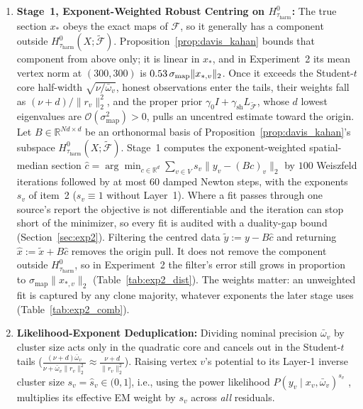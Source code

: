 \documentclass[11pt,a4paper]{article}
\theoremstyle{definition}
\theoremstyle{remark}
\newcommand{\R}{\mathbb{R}}
\begin{document}
\begin{enumerate}[nosep,leftmargin=1.8em]
  \item \textbf{Stage~1, Exponent-Weighted Robust Centring on $H^0_{\tau_{\mathrm{harm}}}$:} The true section $x_*$ obeys the exact maps of $\mathcal{F}$, so it generally has a component outside $H^0_{\tau_{\mathrm{harm}}}(X;\widetilde{\mathcal{F}})$. Proposition~\ref{prop:davis_kahan} bounds that component from above only; it is linear in $x_*$, and in Experiment~2 its mean vertex norm at $(300,300)$ is $0.53\,\sigma_{\mathrm{map}}\|x_{*,v}\|_2$. Once it exceeds the Student-$t$ core half-width $\sqrt{\nu/\bar{\omega}_v}$, honest observations enter the tails, their weights fall as $(\nu+d)/\|r_v\|_2^2$, and the proper prior $\gamma_0 I + \gamma_{\mathrm{sh}} L_{\widetilde{\mathcal{F}}}$, whose $d$ lowest eigenvalues are $\mathcal{O}(\sigma_{\mathrm{map}}^2) > 0$, pulls an uncentred estimate toward the origin. Let $B \in \R^{Nd \times d}$ be an orthonormal basis of Proposition~\ref{prop:davis_kahan}'s subspace $H^0_{\tau_{\mathrm{harm}}}(X;\widetilde{\mathcal{F}})$. Stage~1 computes the exponent-weighted spatial-median section $\hat{c} = \arg\min_{c \in \R^d} \sum_{v \in V} s_v \|y_v - (Bc)_v\|_2$ by $100$ Weiszfeld iterations \cite{weiszfeld1937point} followed by at most $60$ damped Newton steps, with the exponents $s_v$ of item~2 ($s_v \equiv 1$ without Layer~1). Where a fit passes through one source's report the objective is not differentiable and the iteration can stop short of the minimizer, so every fit is audited with a duality-gap bound (Section~\ref{sec:exp2}). Filtering the centred data $\tilde{y} := y - B\hat{c}$ and returning $\hat{x} := \tilde{x} + B\hat{c}$ removes the origin pull. It does not remove the component outside $H^0_{\tau_{\mathrm{harm}}}$, so in Experiment~2 the filter's error still grows in proportion to $\sigma_{\mathrm{map}}\|x_{*,v}\|_2$ (Table~\ref{tab:exp2_dist}). The weights matter: an unweighted fit is captured by any clone majority, whatever exponents the later stage uses (Table~\ref{tab:exp2_comb}).
  \item \textbf{Likelihood-Exponent Deduplication:} Dividing nominal precision $\bar{\omega}_v$ by cluster size acts only in the quadratic core and cancels out in the Student-$t$ tails ($\frac{(\nu+d)\bar{\omega}_v}{\nu + \bar{\omega}_v \|r_v\|_2^2} \approx \frac{\nu+d}{\|r_v\|_2^2}$). Raising vertex $v$'s potential to its Layer-1 inverse cluster size $s_v = \hat{s}_v \in (0, 1]$, i.e., using the power likelihood $P(y_v \mid x_v, \bar{\omega}_v)^{s_v}$ \cite{holmes2017assigning}, multiplies its effective EM weight by $s_v$ across \emph{all} residuals.

\end{enumerate}
\end{document}
